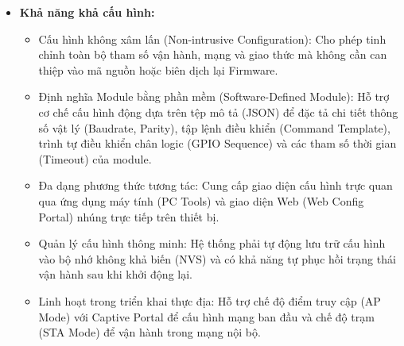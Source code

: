 \begin{itemize}
        \item \textbf{Khả năng khả cấu hình:}
        \begin{itemize}
            \item Cấu hình không xâm lấn (Non-intrusive Configuration): Cho phép tinh chỉnh toàn bộ tham số vận hành, mạng và giao thức mà không cần can thiệp vào mã nguồn hoặc biên dịch lại Firmware.
            \item Định nghĩa Module bằng phần mềm (Software-Defined Module): Hỗ trợ cơ chế cấu hình động dựa trên tệp mô tả (JSON) để đặc tả chi tiết thông số vật lý (Baudrate, Parity), tập lệnh điều khiển (Command Template), trình tự điều khiển chân logic (GPIO Sequence) và các tham số thời gian (Timeout) của module.
            \item Đa dạng phương thức tương tác: Cung cấp giao diện cấu hình trực quan qua ứng dụng máy tính (PC Tools) và giao diện Web (Web Config Portal) nhúng trực tiếp trên thiết bị.
            \item Quản lý cấu hình thông minh: Hệ thống phải tự động lưu trữ cấu hình vào bộ nhớ không khả biến (NVS) và có khả năng tự phục hồi trạng thái vận hành sau khi khởi động lại.
            \item Linh hoạt trong triển khai thực địa: Hỗ trợ chế độ điểm truy cập (AP Mode) với Captive Portal để cấu hình mạng ban đầu và chế độ trạm (STA Mode) để vận hành trong mạng nội bộ.
        \end{itemize}
    \end{itemize}